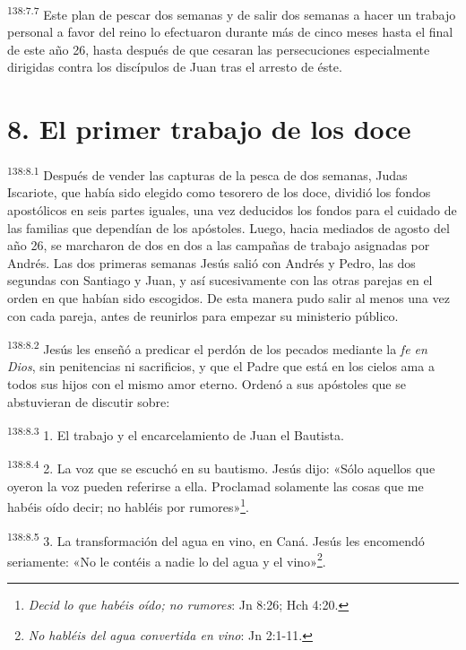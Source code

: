 \par
\textsuperscript{138:7.7} Este plan de pescar dos semanas y de salir dos semanas a hacer un trabajo personal a favor del reino lo efectuaron durante más de cinco meses hasta el final de este año 26, hasta después de que cesaran las persecuciones especialmente dirigidas contra los discípulos de Juan tras el arresto de éste.

\section*{8. El primer trabajo de los doce}
\par
\textsuperscript{138:8.1} Después de vender las capturas de la pesca de dos semanas, Judas Iscariote, que había sido elegido como tesorero de los doce, dividió los fondos apostólicos en seis partes iguales, una vez deducidos los fondos para el cuidado de las familias que dependían de los apóstoles. Luego, hacia mediados de agosto del año 26, se marcharon de dos en dos a las campañas de trabajo asignadas por Andrés. Las dos primeras semanas Jesús salió con Andrés y Pedro, las dos segundas con Santiago y Juan, y así sucesivamente con las otras parejas en el orden en que habían sido escogidos. De esta manera pudo salir al menos una vez con cada pareja, antes de reunirlos para empezar su ministerio público.

\par
\textsuperscript{138:8.2} Jesús les enseñó a predicar el perdón de los pecados mediante la \textit{fe en Dios}, sin penitencias ni sacrificios, y que el Padre que está en los cielos ama a todos sus hijos con el mismo amor eterno. Ordenó a sus apóstoles que se abstuvieran de discutir sobre:

\par
\textsuperscript{138:8.3} 1. El trabajo y el encarcelamiento de Juan el Bautista.

\par
\textsuperscript{138:8.4} 2. La voz que se escuchó en su bautismo. Jesús dijo: «Sólo aquellos que oyeron la voz pueden referirse a ella. Proclamad solamente las cosas que me habéis oído decir; no habléis por rumores»\footnote{\textit{Decid lo que habéis oído; no rumores}: Jn 8:26; Hch 4:20.}.

\par
\textsuperscript{138:8.5} 3. La transformación del agua en vino, en Caná. Jesús les encomendó seriamente: «No le contéis a nadie lo del agua y el vino»\footnote{\textit{No habléis del agua convertida en vino}: Jn 2:1-11.}.


